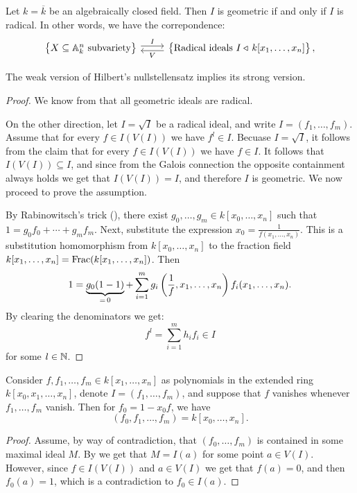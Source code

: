 \documentclass[11pt,a4paper]{article}
\newcommand{\A}{\mathbb A}
\begin{document}
\begin{theorem}
  Let $k = \overline k$ be an algebraically closed field.
  Then $I$ is geometric if and only if $I$ is radical.
  In other words, we have the correpondence:
  \[
  \begin{tikzcd}
    \set{X \subseteq \A_k^n \text{ subvariety}}
    \arrow[r, shift left, "I"] &
    \set{\text{Radical ideals } I \normalin k[x_1,\dots,x_n]}
    \arrow[l, shift left, "V"],
  \end{tikzcd}
  \]
\end{theorem}
\begin{lemma}
  The weak version of Hilbert's nullstellensatz implies its strong version.
\end{lemma}
\begin{proof}
  We know from  that all geometric ideals
  are radical.

  On the other direction, let $I = \sqrt{I}$ be a radical ideal,
  and write $I = (f_1,\dots,f_m)$.
  Assume that for every $f \in I(V(I))$
  we have $f^l \in I$.
  Becuase $I = \sqrt{I}$, it follows from the claim
  that for every $f \in I(V(I))$ we have $f \in I$.
  It follows that $I(V(I)) \subseteq I$,
  and since from the Galois connection the opposite containment always
  holds we get that $I(V(I)) = I$, and therefore $I$ is geometric.
  We now proceed to prove the assumption.

  By Rabinowitsch's trick (), there exist $g_0,\dots,g_m \in k[x_0,\dots,x_n]$
  such that $1 = g_0 f_0 + \cdots + g_m f_m$.
  Next, substitute the expression $x_0 = \frac{1}{f(x_1,\dots,x_n)}$.
  This is a substitution homomorphism
  from $k[x_0,\dots,x_n]$
  to the fraction field $k[x_1,\dots,x_n] = \operatorname{Frac}(k[x_1,\dots,x_n])$.
  Then
  \[
    1 = \underbrace{g_0 (1 - 1)}_{=\,0} +
    \sum_{i=1}^{m} g_i\del{\frac{1}{f},x_1,\dots,x_n} f_i(x_1,\dots,x_n).
  \]
  By clearing the denominators we get:
  \[
    f^l =
    \sum_{i=1}^{m} h_i f_i \in I
  \]
  for some $l \in \mathbb{N}$.
\end{proof}

\begin{proposition}
  \label{prop:rabinowitsch-trick}
  Consider $f,f_1,\dots,f_m \in k[x_1,\dots,x_n]$ as polynomials in the extended
  ring $k[x_0,x_1,\dots,x_n]$,
  denote $I = (f_1,\dots,f_m)$, and suppose that $f$
  vanishes whenever $f_1,\dots,f_m$ vanish.
  Then for $f_0 = 1 - x_0 f$, we have
  \[
    (f_0,f_1,\dots,f_m) = k[x_0,\dots,x_n].
  \]
\end{proposition}
\begin{proof}
  Assume, by way of contradiction,
  that $(f_0,\dots,f_m)$ is contained in some maximal ideal $M$.
  By  we get that $M = I(a)$ for some point $a \in V(I)$.
  However, since $f \in I(V(I))$ and $a \in V(I)$ we get that $f(a) = 0$,
  and then $f_0(a) = 1$,
  which is a contradiction to $f_0 \in I(a)$.
\end{proof}
\end{document}
